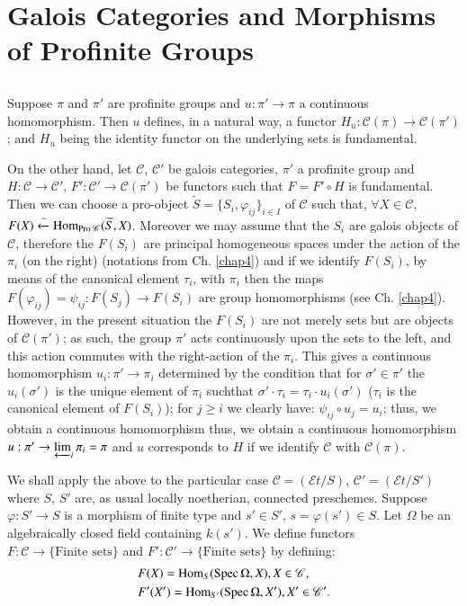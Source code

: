 \chapter{Galois Categories and Morphisms of Profinite Groups}\label{chap5}

\section{}\label{chap5-sec5.1}\pageoriginale

Suppose $\pi$ and $\pi'$ are profinite groups and $u:\pi'\to \pi$ a
continuous homomorphism. Then $u$ defines, in a natural way, a functor
$H_{u}:\mathscr{C}(\pi)\to \mathscr{C}(\pi')$; and $H_{u}$ being the
identity functor on the underlying sets is fundamental.

On the other hand, let $\mathscr{C}$, $\mathscr{C}'$ be galois
categories, $\pi'$ a profinite group and $H:\mathscr{C}\to
\mathscr{C}'$, $F':\mathscr{C}'\to\mathscr{C}(\pi')$ be functors such
that $F=F'\circ H$ is fundamental. Then we can choose a pro-object
$\widetilde{S}=\{S_{i},\varphi_{ij}\}_{i\in I}$ of $\mathscr{C}$ such
that, $\forall X\in \mathscr{C}$,
$F(X)\xleftarrow{\sim}\operatorname{Hom}_{\operatorname{Pro}\mathscr{C}}(\widetilde{S},X)$. Moreover
we may assume that the $S_{i}$ are galois objects of $\mathscr{C}$,
therefore the $F(S_{i})$ are principal homogeneous spaces under the
action of the $\pi_{i}$ (on the right) (notations from Ch. \ref{chap4}) and
if we identify $F(S_{i})$, by means of the canonical element
$\tau_{i}$, with $\pi_{i}$ then the maps
$F(\varphi_{ij})=\psi_{ij}:F(S_{j})\to F(S_{i})$ are group
homomorphisms (see Ch. \ref{chap4}). However, in the present situation the
$F(S_{i})$ are not merely sets but are objects of $\mathscr{C}(\pi')$;
as such, the group $\pi'$ acts continuously upon the sets to the left,
and this action commutes with the right-action of the $\pi_{i}$. This
gives a continuous homomorphism $u_{i}:\pi'\to \pi_{i}$ determined by
the condition that for $\sigma'\in\pi'$ the $u_{i}(\sigma')$ is the
unique element of $\pi_{i}$ such\pageoriginale that $\sigma'\cdot
\tau_{i}=\tau_{i}\cdot u_{i}(\sigma')$ ($\tau_{i}$ is the canonical
element of $F(S_{i})$); for $j\geq i$ we clearly have: $\psi_{ij}\circ
u_{j}=u_{i}$; thus, we obtain a continuous homomorphism thus, we
obtain a continuous homomorphism $u:\pi'\to
\varprojlim_{i}\pi_{i}=\pi$ and $u$ corresponds to $H$ if we identify
$\mathscr{C}$ with $\mathscr{C}(\pi)$.

\begin{example*}
We shall apply the above to the particular case
$\mathscr{C}=(\mathscr{E}t/S)$, $\mathscr{C}'=(\mathscr{E}t/S')$ where
$S$, $S'$ are, as usual locally noetherian, connected
preschemes. Suppose $\varphi:S'\to S$ is a morphism of finite type and
$s'\in S'$, $s=\varphi(s')\in S$. Let $\Omega$ be an algebraically
closed field containing $k(s')$. We define functors
$F:\mathscr{C}\to\{\text{Finite sets}\}$ and
$F':\mathscr{C}'\to\{\text{Finite sets}\}$ by defining:
\begin{align*}
& F(X) =\operatorname{Hom}_{S}(\operatorname{Spec} \Omega,X),X\in \mathscr{C},\\
& F'(X')=\operatorname{Hom}_{S'}(\operatorname{Spec} \Omega,X'),X'\in\mathscr{C}'. 
\end{align*}
\end{example*}

